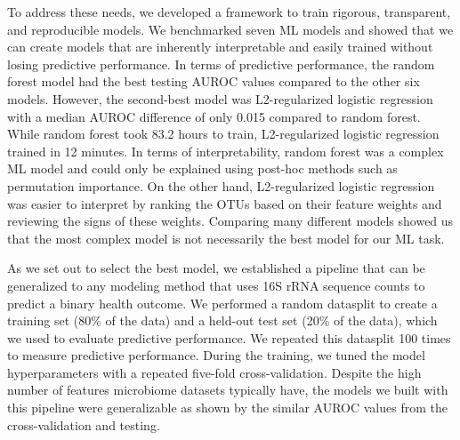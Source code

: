 \documentclass[11pt,]{article}
\begin{document}
To address these needs, we developed a framework to train rigorous,
transparent, and reproducible models. We benchmarked seven ML models and
showed that we can create models that are inherently interpretable and
easily trained without losing predictive performance. In terms of
predictive performance, the random forest model had the best testing
AUROC values compared to the other six models. However, the second-best
model was L2-regularized logistic regression with a median AUROC
difference of only 0.015 compared to random forest. While random forest
took 83.2 hours to train, L2-regularized logistic regression trained in
12 minutes. In terms of interpretability, random forest was a complex ML
model and could only be explained using post-hoc methods such as
permutation importance. On the other hand, L2-regularized logistic
regression was easier to interpret by ranking the OTUs based on their
feature weights and reviewing the signs of these weights. Comparing many
different models showed us that the most complex model is not
necessarily the best model for our ML task.

As we set out to select the best model, we established a pipeline that
can be generalized to any modeling method that uses 16S rRNA sequence
counts to predict a binary health outcome. We performed a random
datasplit to create a training set (80\% of the data) and a held-out
test set (20\% of the data), which we used to evaluate predictive
performance. We repeated this datasplit 100 times to measure predictive
performance. During the training, we tuned the model hyperparameters
with a repeated five-fold cross-validation. Despite the high number of
features microbiome datasets typically have, the models we built with
this pipeline were generalizable as shown by the similar AUROC values
from the cross-validation and testing.
\end{document}
